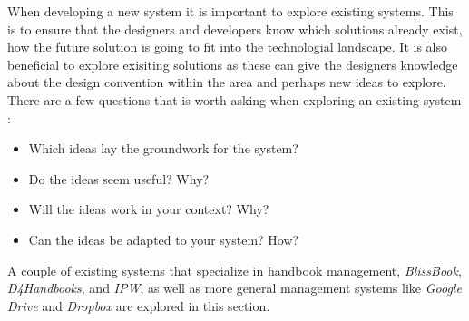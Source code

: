 When developing a new system it is important to explore existing systems.
This is to ensure that the designers and developers know which solutions already exist, how the future solution is going to fit into the technologial landscape.
It is also beneficial to explore exisiting solutions as these can give the designers knowledge about the design convention within the area and perhaps new ideas to explore.
There are a few questions that is worth asking when exploring an existing system \citep[p.~33]{Rod-Aalborg}:

\begin{itemize}
  \item Which ideas lay the groundwork for the system?
  \item Do the ideas seem useful? Why?
  \item Will the ideas work in your context? Why?
  \item Can the ideas be adapted to your system? How?
\end{itemize}  

A couple of existing systems that specialize in handbook management, \textit{BlissBook}, \textit{D4Handbooks}, and \textit{IPW}, as well as more general management systems like \textit{Google Drive} and \textit{Dropbox} are explored in this section.
